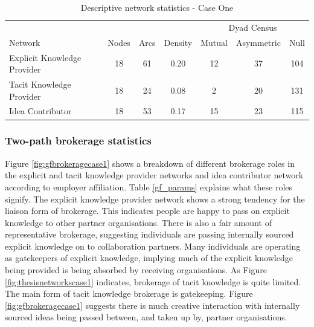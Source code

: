 \begin{table}[]
	\small
	\centering
	\caption{Descriptive network statistics - Case One}
	\label{ds_c1}
	\begin{tabular}{@{}lcccccc@{}}
		\toprule
		& \multicolumn{1}{l}{} & \multicolumn{1}{l}{} & \multicolumn{1}{l}{} & \multicolumn{3}{c}{Dyad Census}	\\ \cline{5-7}
		Network						& Nodes			& Arcs			& Density	& Mutual		& Asymmetric	& Null		\\ \midrule
		Explicit Knowledge Provider & 18			& 61			& 0.20		& 12			& 37			& 104		\\
		Tacit Knowledge Provider    & 18			& 24			& 0.08		& 2				& 20			& 131		\\
		Idea Contributor            & 18			& 53			& 0.17		& 15			& 23			& 115		\\ \bottomrule
	\end{tabular}
\end{table}


\subsubsection{Two-path brokerage statistics}

Figure \ref{fig:gfbrokeragecase1} shows a breakdown of different brokerage roles in the explicit and tacit knowledge provider networks and idea contributor network according to employer affiliation. Table \ref{gf_params} explains what these roles signify. The explicit knowledge provider network shows a strong tendency for the liaison form of brokerage. This indicates people are happy to pass on explicit knowledge to other partner organisations. There is also a fair amount of representative brokerage, suggesting individuals are passing internally sourced explicit knowledge on to collaboration partners. Many individuals are operating as gatekeepers of explicit knowledge, implying much of the explicit knowledge being provided is being absorbed by receiving organisations. As Figure \ref{fig:thesisnetworkscase1} indicates, brokerage of tacit knowledge is quite limited. The main form of tacit knowledge brokerage is gatekeeping. Figure \ref{fig:gfbrokeragecase1} suggests there is much creative interaction with internally sourced ideas being passed between, and taken up by, partner organisations.


 


